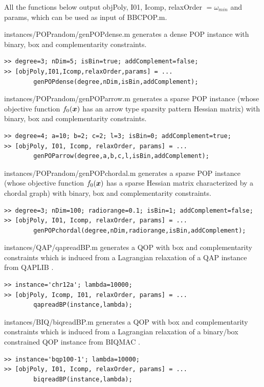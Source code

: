 \documentclass[12pt]{article}
\def\x{\mbox{\boldmath $x$}}
\def\matBP{BBCPOP}
\begin{document}
All the functions below output {\sf objPoly}, {\sf I01}, {\sf Icomp}, {\sf relaxOrder} $=\omega_{min}$ and {\sf params}, which 
can be used as input of \matBP.m.
\begin{description}
\item{instances/POPrandom/genPOPdense.m } generates a dense POP instance with binary, box and complementarity constraints.
\begin{verbatim}
>> degree=3; nDim=5; isBin=true; addComplement=false; 
>> [objPoly,I01,Icomp,relaxOrder,params] = ... 
        genPOPdense(degree,nDim,isBin,addComplement); 
\end{verbatim}
\item{instances/POPrandom/genPOParrow.m } generates a sparse POP instance (whose objective function $f_0(\x)$ has 
an arrow type sparsity pattern Hessian matrix) with binary, box and complementarity constraints.
\begin{verbatim}
>> degree=4; a=10; b=2; c=2; l=3; isBin=0; addComplement=true; 
>> [objPoly, I01, Icomp, relaxOrder, params] = ...
        genPOParrow(degree,a,b,c,l,isBin,addComplement);
\end{verbatim}
\item{instances/POPrandom/genPOPchordal.m } generates a sparse POP instance (whose objective function $f_0(\x)$ has 
a sparse Hessian matrix characterized by a chordal graph) with binary, box and complementarity constraints.
\begin{verbatim}
>> degree=3; nDim=100; radiorange=0.1; isBin=1; addComplement=false;
>> [objPoly, I01, Icomp, relaxOrder, params] = ...
        genPOPchordal(degree,nDim,radiorange,isBin,addComplement);
\end{verbatim}
\item{instances/QAP/qapreadBP.m} generates a QOP with box and complementarity constraints which is induced from a Lagrangian relaxation of a QAP instance from QAPLIB \cite{QAPLIB}.
\begin{verbatim}
>> instance='chr12a'; lambda=10000; 
>> [objPoly, Icomp, I01, relaxOrder, params] = ...
        qapreadBP(instance,lambda);
\end{verbatim}
\item{instances/BIQ/biqreadBP.m} generates a QOP with box and complementarity constraints which is induced from a Lagrangian 
relaxation of a binary/box constrained QOP instance from  BIQMAC \cite{BIQMAC}.
\begin{verbatim}
>> instance='bqp100-1'; lambda=10000;
>> [objPoly, I01, Icomp, relaxOrder, params] = ...
        biqreadBP(instance,lambda);
\end{verbatim}
\end{description}
\end{document}
